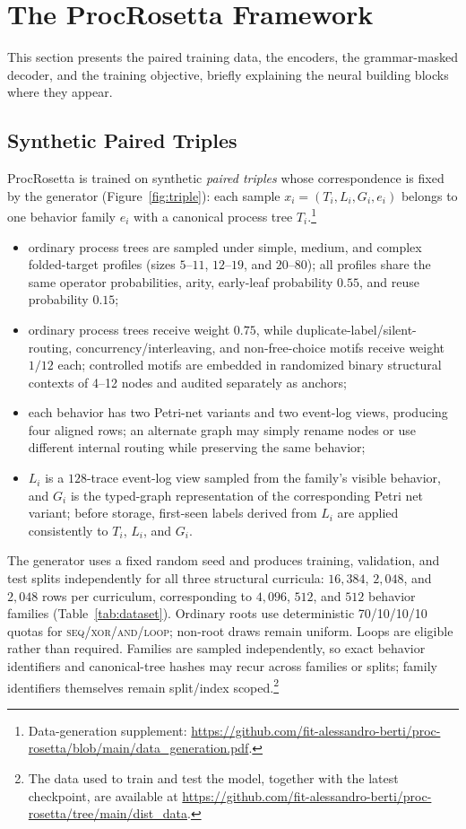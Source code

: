 \documentclass[manuscript,screen,nonacm]{acmart}
\begin{document}
\section{The ProcRosetta Framework}
\label{sec:approach}

This section presents the paired training data, the encoders, the grammar-masked decoder, and the training objective, briefly explaining the neural building blocks where they appear.

\subsection{Synthetic Paired Triples}
\label{sec:datagen}

ProcRosetta is trained on synthetic \emph{paired triples} whose correspondence is fixed by the generator (Figure~\ref{fig:triple}): each sample $x_i = (T_i, L_i, G_i, e_i)$ belongs to one behavior family $e_i$ with a canonical process tree $T_i$.\footnote{Data-generation supplement: \url{https://github.com/fit-alessandro-berti/proc-rosetta/blob/main/data_generation.pdf}.}
\begin{itemize}
  \item ordinary process trees are sampled under simple, medium, and complex folded-target profiles (sizes $5$--$11$, $12$--$19$, and $20$--$80$); all profiles share the same operator probabilities, arity, early-leaf probability $0.55$, and reuse probability $0.15$;
  \item ordinary process trees receive weight $0.75$, while duplicate-label/silent-routing, concurrency/interleaving, and non-free-choice motifs receive weight $1/12$ each; controlled motifs are embedded in randomized binary structural contexts of 4--12 nodes and audited separately as anchors;
  \item each behavior has two Petri-net variants and two event-log views, producing four aligned rows; an alternate graph may simply rename nodes or use different internal routing while preserving the same behavior;
  \item $L_i$ is a $128$-trace event-log view sampled from the family's visible behavior, and $G_i$ is the typed-graph representation of the corresponding Petri net variant; before storage, first-seen labels derived from $L_i$ are applied consistently to $T_i$, $L_i$, and $G_i$.
\end{itemize}
The generator uses a fixed random seed and produces training, validation, and test splits independently for all three structural curricula: $16{,}384$, $2{,}048$, and $2{,}048$ rows per curriculum, corresponding to $4{,}096$, $512$, and $512$ behavior families (Table~\ref{tab:dataset}). Ordinary roots use deterministic 70/10/10/10 quotas for \textsc{seq}/\textsc{xor}/\textsc{and}/\textsc{loop}; non-root draws remain uniform. Loops are eligible rather than required. Families are sampled independently, so exact behavior identifiers and canonical-tree hashes may recur across families or splits; family identifiers themselves remain split/index scoped.\footnote{The data used to train and test the model, together with the latest checkpoint, are available at \url{https://github.com/fit-alessandro-berti/proc-rosetta/tree/main/dist_data}.}
\end{document}
